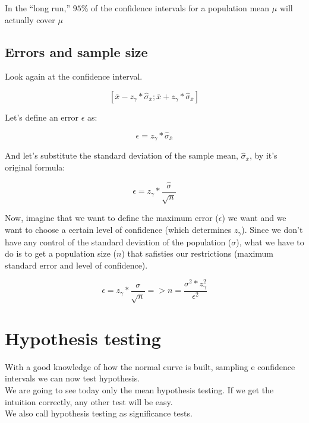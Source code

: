 \documentclass[11pt]{article}
\begin{document}
In the “long run,” $95\%$ of the confidence intervals for a population mean $\mu$ will actually cover $\mu$

	\subsection*{Errors and sample size}

	Look again at the confidence interval.

	\[[\bar{x}-z_\gamma*\hat{\sigma}_{\bar{x}};\bar{x}+z_\gamma*\hat{\sigma}_{\bar{x}}]\]

	Let's define an error $\epsilon$ as:
	
	\[\epsilon=z_\gamma*\hat{\sigma}_{\bar{x}}\]	
	
	And let's substitute the standard deviation of the sample mean, $\hat{\sigma}_{\bar{x}}$, by it's original formula:
	
	\[\epsilon=z_\gamma*\frac{\hat{\sigma}}{\sqrt{n}}\]	

Now, imagine that we want to define the maximum error ($\epsilon$) we want and we want to choose a certain level of confidence (which determines $z_\gamma$). Since we don't have any control of the standard deviation of the population ($\sigma$), what we have to do is to get a population size ($n$) that safisties our restrictions (maximum standard error and level of confidence).

	\[\epsilon=z_\gamma*\frac{\sigma}{\sqrt{n}} => n=\frac{\sigma^2*z_\gamma^2}{\epsilon^2}\]	

\section{Hypothesis testing}


	With a good knowledge of how the normal curve is built, sampling e confidence intervals we can now test hypothesis.\\
	
	We are going to see today only the mean hypothesis testing. If we get the intuition correctly, any other test will be easy.\\
	
	We also call hypothesis testing as significance tests.
\end{document}
